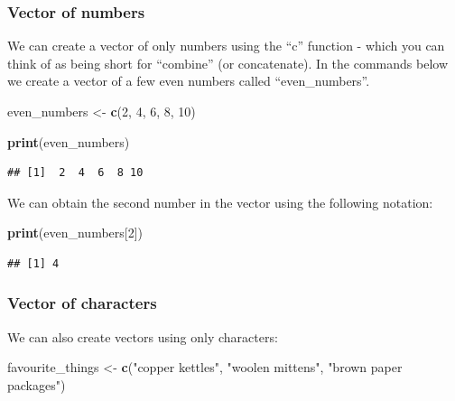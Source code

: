 \documentclass[
]{krantz}
\makeatletter
\newenvironment{Shaded}{\begin{snugshade}}{\end{snugshade}}
\newcommand{\DecValTok}[1]{\textcolor[rgb]{0.06,0.06,0.06}{#1}}
\newcommand{\KeywordTok}[1]{\textcolor[rgb]{0.27,0.27,0.27}{\textbf{#1}}}
\newcommand{\NormalTok}[1]{#1}
\newcommand{\StringTok}[1]{\textcolor[rgb]{0.5,0.5,0.5}{#1}}
\newenvironment{kframe}{%
\medskip{}
\setlength{\fboxsep}{.8em}
 \def\at@end@of@kframe{}%
 \ifinner\ifhmode%
  \def\at@end@of@kframe{\end{minipage}}%
  \begin{minipage}{\columnwidth}%
 \fi\fi%
 \def\FrameCommand##1{\hskip\@totalleftmargin \hskip-\fboxsep
 \colorbox{shadecolor}{##1}\hskip-\fboxsep
     \hskip-\linewidth \hskip-\@totalleftmargin \hskip\columnwidth}%
 \MakeFramed {\advance\hsize-\width
   \@totalleftmargin\z@ \linewidth\hsize
   \@setminipage}}%
 {\par\unskip\endMakeFramed%
 \at@end@of@kframe}
\renewenvironment{Shaded}{\begin{kframe}}{\end{kframe}}
\makeatother
\begin{document}
\hypertarget{vector-of-numbers}{%
\subsubsection{Vector of numbers}\label{vector-of-numbers}}

We can create a vector of only numbers using the ``c'' function - which you can think of as being short for ``combine'' (or concatenate). In the commands below we create a vector of a few even numbers called ``even\_numbers''.

\begin{Shaded}
\begin{Highlighting}[]
\NormalTok{even_numbers <-}\StringTok{ }\KeywordTok{c}\NormalTok{(}\DecValTok{2}\NormalTok{, }\DecValTok{4}\NormalTok{, }\DecValTok{6}\NormalTok{, }\DecValTok{8}\NormalTok{, }\DecValTok{10}\NormalTok{)}
\end{Highlighting}
\end{Shaded}

\begin{Shaded}
\begin{Highlighting}[]
\KeywordTok{print}\NormalTok{(even_numbers)}
\end{Highlighting}
\end{Shaded}

\begin{verbatim}
## [1]  2  4  6  8 10
\end{verbatim}

We can obtain the second number in the vector using the following notation:

\begin{Shaded}
\begin{Highlighting}[]
\KeywordTok{print}\NormalTok{(even_numbers[}\DecValTok{2}\NormalTok{])}
\end{Highlighting}
\end{Shaded}

\begin{verbatim}
## [1] 4
\end{verbatim}

\hypertarget{vector-of-characters}{%
\subsubsection{Vector of characters}\label{vector-of-characters}}

We can also create vectors using only characters:

\begin{Shaded}
\begin{Highlighting}[]
\NormalTok{favourite_things <-}\StringTok{ }\KeywordTok{c}\NormalTok{(}\StringTok{"copper kettles"}\NormalTok{, }\StringTok{"woolen mittens"}\NormalTok{, }\StringTok{"brown paper packages"}\NormalTok{)}
\end{Highlighting}
\end{Shaded}
\end{document}
